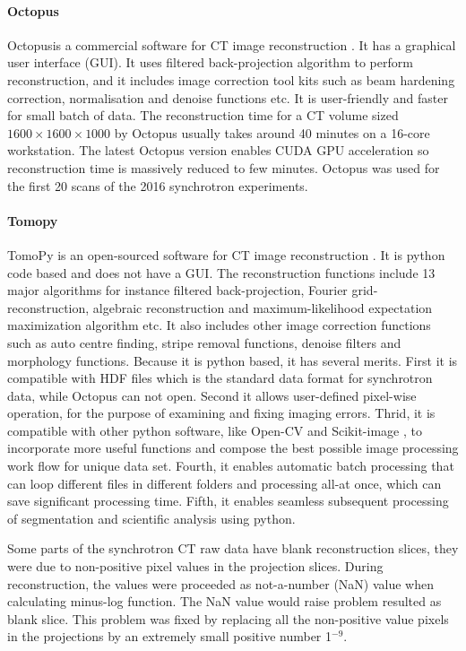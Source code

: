 \paragraph{Octopus}
Octopus\texttrademark is a commercial software for CT image reconstruction \citep{vlassenbroeck2006octopus}. It has a graphical user interface (GUI).  It uses filtered back-projection algorithm to perform reconstruction, and it includes image correction tool kits such as beam hardening correction, normalisation and denoise functions etc. It is user-friendly and faster for small batch of data. The reconstruction time for a CT volume sized $1600 \times 1600 \times 1000$ by Octopus usually takes around 40 minutes on a 16-core workstation. The latest Octopus version enables CUDA GPU acceleration so reconstruction time is massively reduced to few minutes. Octopus was used for the first 20 scans of the 2016 synchrotron experiments.

\paragraph{Tomopy}
TomoPy is an open-sourced software for CT image reconstruction \citep{gursoy2014tomopy}. It is python code based and does not have a GUI. The reconstruction functions include 13 major algorithms for instance filtered back-projection, Fourier grid-reconstruction, algebraic reconstruction and maximum-likelihood expectation maximization algorithm etc. It also includes other image correction functions such as auto centre finding, stripe removal functions, denoise filters and morphology functions. Because it is python based, it has several merits. First it is compatible with HDF files which is the standard data format for synchrotron data, while Octopus can not open. Second it allows user-defined pixel-wise operation, for the purpose of examining and fixing imaging errors. Thrid, it is compatible with other python software, like Open-CV \citep{opencv_library} and Scikit-image \citep{scikit-image}, to incorporate more useful functions and compose the best possible image processing work flow for unique data set. Fourth, it enables automatic batch processing that can loop different files in different folders and processing all-at once, which can save significant processing time. Fifth, it enables seamless subsequent processing of segmentation and scientific analysis using python.

Some parts of the synchrotron CT raw data have blank reconstruction slices, they were due to non-positive pixel values in the projection slices. During reconstruction, the values were proceeded as not-a-number (NaN) value when calculating minus-log function. The NaN value would raise problem resulted as blank slice. This problem was fixed by replacing all the non-positive value pixels in the projections by an extremely small positive number 1$^{-9}$.

